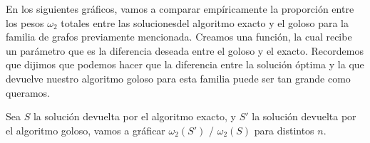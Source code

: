 
En los siguientes gráficos, vamos a comparar empíricamente la proporción entre los pesos $\omega_2$ totales entre las solucionesdel algoritmo exacto y el goloso para la familia de grafos previamente mencionada. Creamos una función, la cual recibe un parámetro que es la diferencia deseada entre el goloso y el exacto. Recordemos que dijimos que podemos hacer que la diferencia entre la solución óptima y la que devuelve nuestro algoritmo goloso para esta familia puede ser tan grande como queramos.

Sea $S$ la solución devuelta por el algoritmo exacto, y $S'$ la solución devuelta por el algoritmo goloso, vamos a gráficar $\omega_2(S')$ / $\omega_2(S)$ para distintos $n$.

